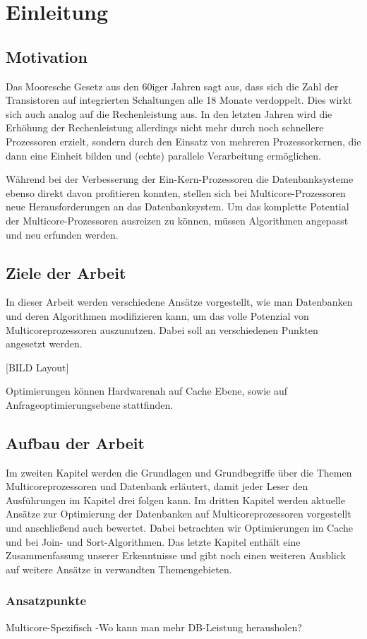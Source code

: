 \chapter{Einleitung}
\label{sec:Einleitung}

\section{Motivation}
\label{sec:Motivation}
Das Mooresche Gesetz aus den 60iger Jahren sagt aus, dass sich die Zahl der Transistoren auf integrierten Schaltungen alle 18 Monate verdoppelt. Dies wirkt sich auch analog auf die Rechenleistung aus. In den letzten Jahren wird die Erhöhung der Rechenleistung allerdings nicht mehr durch noch schnellere Prozessoren erzielt, sondern durch den Einsatz von mehreren Prozessorkernen, die dann eine Einheit bilden und (echte) parallele Verarbeitung ermöglichen.

Während bei der Verbesserung der Ein-Kern-Prozessoren die Datenbanksysteme ebenso direkt davon profitieren konnten, stellen sich bei Multicore-Prozessoren neue Herausforderungen an das Datenbanksystem. Um das komplette Potential der Multicore-Prozessoren ausreizen zu können, müssen Algorithmen angepasst und neu erfunden werden.

\section{Ziele der Arbeit}
\label{sec:ZieleDerArbeit}
In dieser Arbeit werden verschiedene Ansätze vorgestellt, wie man Datenbanken und deren Algorithmen modifizieren kann, um das volle Potenzial von Multicoreprozessoren auszunutzen. Dabei soll an verschiedenen Punkten angesetzt werden. 

[BILD Layout]

Optimierungen können Hardwarenah auf Cache Ebene, sowie auf Anfrageoptimierungsebene stattfinden.

\section{Aufbau der Arbeit}
\label{sec:AufbauDerArbeit}
Im zweiten Kapitel werden die Grundlagen und Grundbegriffe über die Themen Multicoreprozessoren und Datenbank erläutert, damit jeder Leser den Ausführungen im Kapitel drei folgen kann. Im dritten Kapitel werden aktuelle Ansätze zur Optimierung der Datenbanken auf Multicoreprozessoren vorgestellt und anschließend auch bewertet. Dabei betrachten wir Optimierungen im Cache und bei Join- und Sort-Algorithmen. Das letzte Kapitel enthält eine Zusammenfassung unserer Erkenntnisse und gibt noch einen weiteren Ausblick auf weitere Ansätze in verwandten Themengebieten.


\subsection*{Ansatzpunkte}
\label{sec:Ansatzpunkte}
Multicore-Spezifisch -Wo kann man mehr DB-Leistung herausholen? 
